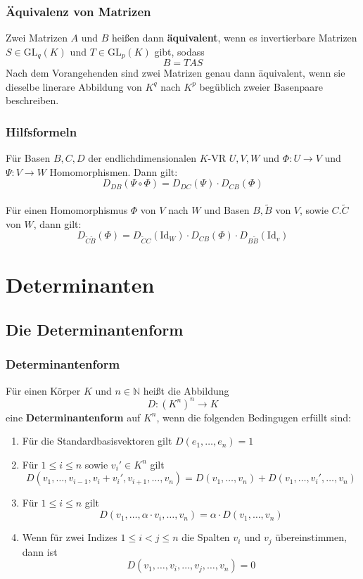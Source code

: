 \documentclass{kit}
\begin{document}
    \subsubsection{Äquivalenz von Matrizen}
      Zwei Matrizen $A$ und $B$ heißen dann \textbf{äquivalent}, wenn es invertierbare Matrizen $S\in\text{GL}_q(K)$ und $T\in\text{GL}_p(K)$ gibt, sodass
      $$B=TAS$$
      Nach dem Vorangehenden sind zwei Matrizen genau dann äquivalent, wenn sie dieselbe linerare Abbildung von $K^q$ nach $K^p$ begüblich zweier Basenpaare beschreiben.
    \subsubsection{Hilfsformeln}
      Für Basen $B,C,D$ der endlichdimensionalen $K$-VR $U,V,W$ und $\Phi:U\longrightarrow V$ und \\
      $\Psi:V\longrightarrow W$ Homomorphismen. Dann gilt:
      $$D_{DB}(\Psi\circ\Phi)=D_{DC}(\Psi)\cdot D_{CB}(\Phi)$$
      \\
      Für einen Homomorphismus $\Phi$ von $V$ nach $W$ und Basen $B,\tilde B$ von $V$, sowie $C.\tilde C$ von $W$, dann gilt:
      $$D_{\tilde C\tilde B}(\Phi)=D_{\tilde CC}(\text{Id}_W)\cdot D_{CB}(\Phi)\cdot D_{B\tilde B}(\text{Id}_v)$$
\section{Determinanten}
  \subsection{Die Determinantenform}
    \subsubsection{Determinantenform}
      Für einen Körper $K$ und $n\in\mathbb{N}$ heißt die Abbildung
      $$D:(K^n)^n\longrightarrow K$$
      eine \textbf{Determinantenform} auf $K^n$, wenn die folgenden Bedingugen erfüllt sind:
      \begin{enumerate}[label=D\arabic*]
        \item Für die Standardbasisvektoren gilt $D(e_1,\dots,e_n)=1$
        \item Für $1\le i\le n$ sowie $v_i'\in K^n$ gilt
          $$D(v_1,\dots,v_{i-1},v_i+v_i',v_{i+1},\dots,v_n)=D(v_1,\dots,v_n)+D(v_1,\dots,v_i',\dots,v_n)$$
        \item Für $1\le i\le n$ gilt
          $$D(v_1,\dots,\alpha\cdot v_i,\dots,v_n)=\alpha\cdot D(v_1,\dots,v_n)$$
        \item Wenn für zwei Indizes $1\le i<j\le n$ die Spalten $v_i$ und $v_j$ übereinstimmen, dann ist
          $$D(v_1,\dots,v_i,\dots,v_j,\dots,v_n)=0$$
      \end{enumerate}
\end{document}
